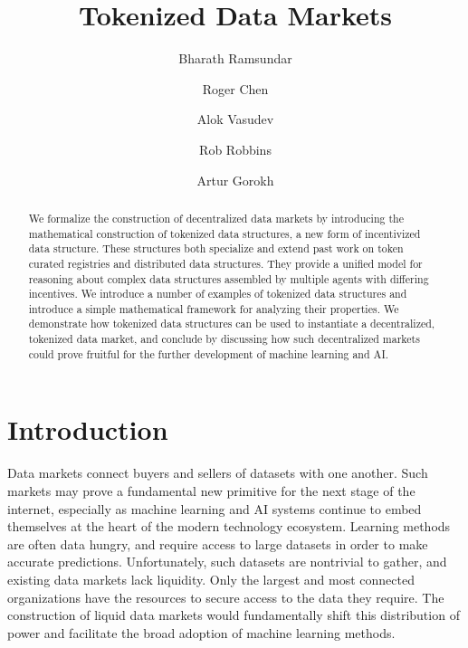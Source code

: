 \documentclass{llncs}
\begin{document}
\title{Tokenized Data Markets}
\author{Bharath Ramsundar \and Roger Chen \and
Alok Vasudev \and Rob Robbins \and Artur Gorokh}





\maketitle

\begin{abstract}
We formalize the construction of decentralized data markets by introducing the mathematical construction of tokenized data structures, a new form of incentivized data structure. These structures both specialize and extend past work on token curated registries and distributed data structures. They provide a unified model for reasoning about complex data structures assembled by multiple agents with differing incentives. We introduce a number of examples of tokenized data structures and introduce a simple mathematical framework for analyzing their properties. We demonstrate how tokenized data structures can be used to instantiate a decentralized, tokenized data market, and conclude by discussing how such decentralized markets could prove fruitful for the further development of machine learning and AI.
\end{abstract}

\section{Introduction}

Data markets connect buyers and sellers of datasets with one another. Such markets may prove a fundamental new primitive for the next stage of the internet, especially as machine learning and AI systems continue to embed themselves at the heart of the modern technology ecosystem. Learning methods are often data hungry, and require access to large datasets in order to make accurate predictions. Unfortunately, such datasets are nontrivial to gather, and existing data markets lack liquidity. Only the largest and most connected organizations have the resources to secure access to the data they require. The construction of liquid data markets would fundamentally shift this distribution of power and facilitate the broad adoption of machine learning methods.
\end{document}
